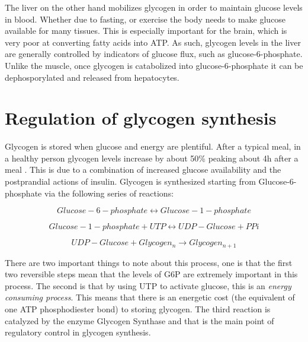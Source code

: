 \documentclass{tufte-handout}
\begin{document}
  The liver on the other hand mobilizes glycogen in order to maintain glucose levels in blood.  Whether due to fasting, or exercise the body needs to make glucose available for many tissues.  This is especially important for the brain, which is very poor at converting fatty acids into ATP.  As such, glycogen levels in the liver are generally controlled by indicators of glucose flux, such as glucose-6-phosphate.  Unlike the muscle, once glycogen is catabolized into glucose-6-phosphate it can be dephosporylated and released from hepatocytes.

\section{Regulation of glycogen synthesis}

Glycogen is stored when glucose and energy are plentiful.  After a typical meal, in a healthy person glycogen levels increase by about 50\% peaking about 4h after a meal \citep{Taylor1996a}.  This is due to a combination of increased glucose availability and the postprandial actions of insulin.  Glycogen is synthesized starting from Glucose-6-phosphate via the following series of reactions:

\begin{equation}
Glucose-6-phosphate \leftrightarrow Glucose-1-phosphate
\end{equation}

\begin{equation}
Glucose-1-phosphate + UTP \leftrightarrow UDP-Glucose + PPi
\end{equation}

\begin{equation}
UDP-Glucose + Glycogen_n \rightarrow Glycogen_{n+1}
\end{equation}

There are two important things to note about this process, one is that the first two reversible steps mean that the levels of G6P are extremely important in this process.  The second is that by using UTP to activate glucose, this is an \emph{energy consuming process}.  This means that there is an energetic cost (the equivalent of one ATP phosphodiester bond) to storing glycogen.  The third reaction is catalyzed by the enzyme Glycogen Synthase and that is the main point of regulatory control in glycogen synthesis.
\end{document}
